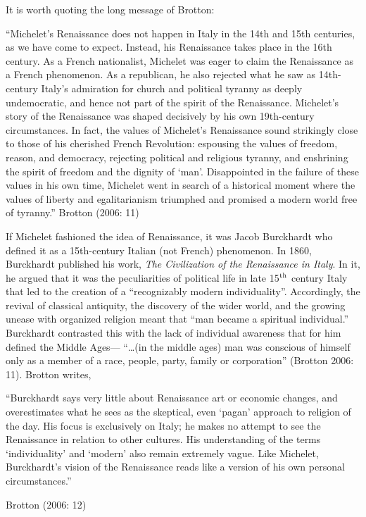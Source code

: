 It is worth quoting the long message of Brotton: 
\begin{myquote} 
“Michelet’s Renaissance does not happen in Italy in the 14th and 15th centuries, as we have come to expect. Instead, his Renaissance takes place in the 16th century. As a French nationalist, Michelet was eager to claim the Renaissance as a French phenomenon. As a republican, he also rejected what he saw as 14th-century Italy’s admiration for church and political tyranny as deeply undemocratic, and hence not part of the spirit of the Renaissance. Michelet’s story of the Renaissance was shaped decisively by his own 19th-century circumstances. In fact, the values of Michelet’s Renaissance sound strikingly close to those of his cherished French Revolution: espousing the values of freedom, reason, and democracy, rejecting political and religious tyranny, and enshrining the spirit of freedom and the dignity of ‘man’. Disappointed in the failure of these values in his own time, Michelet went in search of a historical moment where the values of liberty and egalitarianism triumphed and promised a modern world free of tyranny.”	\hfill{Brotton (2006: 11)}
\end{myquote}

\newpage

If Michelet fashioned the idea of Renaissance, it was Jacob Burckhardt who defined it as a 15th-century Italian (not French) phenomenon. In 1860, Burckhardt published his work, {\sl The Civilization of the Renaissance in Italy}. In it, he argued that it was the peculiarities of political life in late 15$^{\rm th}$ century Italy that led to the creation of a “recognizably modern individuality”. Accordingly, the revival of classical antiquity, the discovery of the wider world, and the growing unease with organized religion meant that “man became a spiritual individual.” Burckhardt contrasted this with the lack of individual awareness that for him defined the Middle Ages—  “…(in the middle ages) man was conscious of himself only as a member of a race, people, party, family or corporation” (Brotton 2006: 11). Brotton writes,
\begin{myquote}
“Burckhardt says very little about Renaissance art or economic changes, and overestimates what he sees as the skeptical, even ‘pagan’ approach to religion of the day. His focus is exclusively on Italy; he makes no attempt to see the Renaissance in relation to other cultures. His understanding of the terms ‘individuality’ and ‘modern’ also remain extremely vague. Like Michelet, Burckhardt’s vision of the Renaissance reads like a version of his own personal circumstances.”  

\hfill{Brotton (2006: 12)}
\end{myquote}

